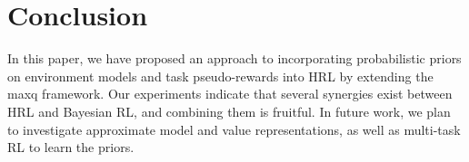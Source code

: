 \section{Conclusion}
\label{sec:conclusion}

In this paper, we have proposed an approach to incorporating
probabilistic priors on environment models and task pseudo-rewards
into HRL by extending the {\sc maxq} framework. 
Our experiments indicate that several
synergies exist between HRL and Bayesian RL, and combining them is
fruitful. In future work, we plan to investigate approximate model and value representations, as well as multi-task RL to learn the priors.

